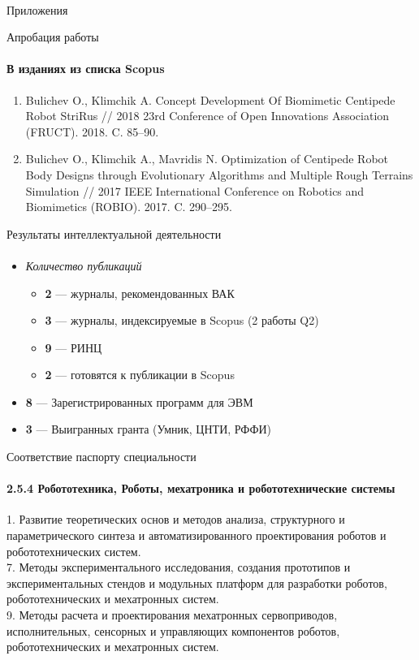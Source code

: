 \documentclass[aspectratio=169,xcolor=table]{beamer}
\begin{document}
\begin{frame}[c]{}
    \framesubtitle{}
    \centering\LARGE Приложения
\end{frame}

\begin{frame}[t]{Апробация работы}
    \framesubtitle{В изданиях из списка Scopus}
    \begin{enumerate}
        \item Bulichev O., Klimchik A. Concept Development Of Biomimetic Centipede Robot StriRus // 2018 23rd Conference of Open Innovations Association (FRUCT). 2018. C. 85–90.
        \item Bulichev O., Klimchik A., Mavridis N. Optimization of Centipede Robot Body Designs through Evolutionary Algorithms and Multiple Rough Terrains Simulation // 2017 IEEE International Conference on Robotics and Biomimetics (ROBIO). 2017. C. 290–295.
    \end{enumerate}
\end{frame}

\begin{frame}[t]{Результаты интеллектуальной деятельности}
    \framesubtitle{}
    \large
    \begin{itemize}
        \item \textit{Количество публикаций}
              \begin{itemize}
                  \large
                  \item \textbf{2} --- журналы, рекомендованных ВАК
                  \item \textbf{3} --- журналы, индексируемые в Scopus (2 работы Q2)
                  \item \textbf{9} --- РИНЦ
                  \item \textbf{2} --- готовятся к публикации в Scopus
              \end{itemize}
        \item \textbf{8} --- Зарегистрированных программ для ЭВМ
        \item \textbf{3} --- Выигранных гранта (Умник, ЦНТИ, РФФИ)
    \end{itemize}
\end{frame}

\begin{frame}[t]{Соответствие паспорту специальности}
    \framesubtitle{2.5.4 Робототехника, Роботы, мехатроника и
        робототехнические системы}
    1. Развитие теоретических основ и методов анализа, структурного и параметрического синтеза и автоматизированного проектирования роботов и робототехнических систем. \\
    7. Методы экспериментального исследования, создания прототипов и
    экспериментальных стендов и модульных платформ для разработки роботов, робототехнических и мехатронных систем. \\
    9. Методы расчета и проектирования мехатронных сервоприводов,
    исполнительных, сенсорных и управляющих компонентов роботов,
    робототехнических и мехатронных систем.
\end{frame}
\end{document}
